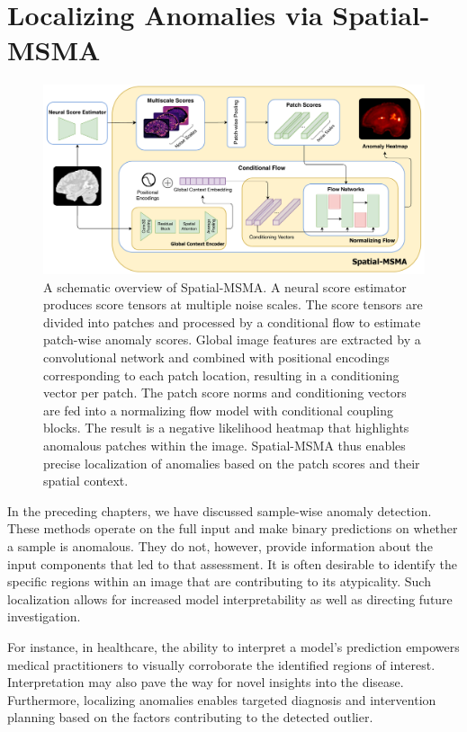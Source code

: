 \chapter{Localizing Anomalies via Spatial-MSMA}
\label{ch:localizing}


\begin{figure}[!b]
    \centering
    \includegraphics[width=\textwidth]{figures/spatial-msma-detailed.pdf}
    \caption{A schematic overview of Spatial-MSMA. A neural score estimator produces score tensors at multiple noise scales. The score tensors are divided into patches and processed by a conditional flow to estimate patch-wise anomaly scores. Global image features are extracted by a convolutional network and combined with positional encodings corresponding to each patch location, resulting in a conditioning vector per patch. The patch score norms and conditioning vectors are fed into a normalizing flow model with conditional coupling blocks. The result is a negative likelihood heatmap that highlights anomalous patches within the image. Spatial-MSMA thus enables precise localization of anomalies based on the patch scores and their spatial context.}
    \label{fig:spatial-overview}
\end{figure}

In the preceding chapters, we have discussed sample-wise anomaly detection. These methods operate on the full input and make binary predictions on whether a sample is anomalous. They do not, however, provide information about the input components that led to that assessment. It is often desirable to identify the specific regions within an image that are contributing to its atypicality. Such localization allows for increased model interpretability as well as directing future investigation. 

For instance, in healthcare, the ability to interpret a model's prediction empowers medical practitioners to visually corroborate the identified regions of interest. Interpretation may also pave the way for novel insights into the disease. Furthermore, localizing anomalies enables targeted diagnosis and intervention planning based on the factors contributing to the detected outlier.

